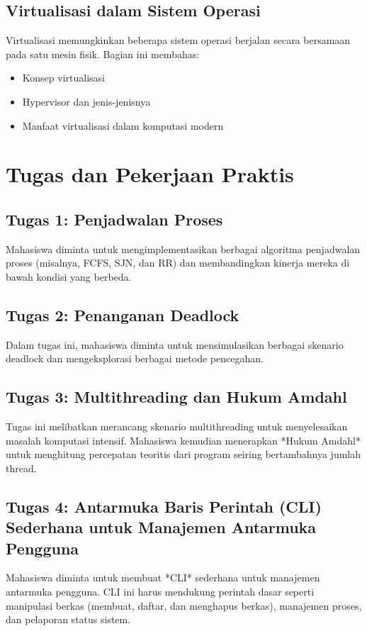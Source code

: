 \documentclass{article}
\begin{document}
\subsection{Virtualisasi dalam Sistem Operasi}
Virtualisasi memungkinkan beberapa sistem operasi berjalan secara bersamaan pada satu mesin fisik. Bagian ini membahas:
\begin{itemize}
    \item Konsep virtualisasi
    \item Hypervisor dan jenis-jenisnya
    \item Manfaat virtualisasi dalam komputasi modern
\end{itemize}

\section{Tugas dan Pekerjaan Praktis}
\subsection{Tugas 1: Penjadwalan Proses}
Mahasiswa diminta untuk mengimplementasikan berbagai algoritma penjadwalan proses (misalnya, FCFS, SJN, dan RR) dan membandingkan kinerja mereka di bawah kondisi yang berbeda.

\subsection{Tugas 2: Penanganan Deadlock}
Dalam tugas ini, mahasiswa diminta untuk mensimulasikan berbagai skenario deadlock dan mengeksplorasi berbagai metode pencegahan.

\subsection{Tugas 3: Multithreading dan Hukum Amdahl}
Tugas ini melibatkan merancang skenario multithreading untuk menyelesaikan masalah komputasi intensif. Mahasiswa kemudian menerapkan *Hukum Amdahl* untuk menghitung percepatan teoritis dari program seiring bertambahnya jumlah thread.

\subsection{Tugas 4: Antarmuka Baris Perintah (CLI) Sederhana untuk Manajemen Antarmuka Pengguna}
Mahasiswa diminta untuk membuat *CLI* sederhana untuk manajemen antarmuka pengguna. CLI ini harus mendukung perintah dasar seperti manipulasi berkas (membuat, daftar, dan menghapus berkas), manajemen proses, dan pelaporan status sistem.
\end{document}
